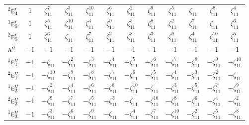 \documentclass[10pt,a4paper]{article}
\numberwithin{equation}{section}
\newcommand{\irr}[1]{\text{\normalfont\scshape #1}}
\newcommand{\conjpair}[1]{{}^{#1}}
\newcommand{\rootunity}[1]{\zeta_{#1}}
\begin{document}
{\begin{longtable}{@{}lccccccccccc@{}}
$\conjpair{2}\irr{e}_{4}'$ & $1$ & $\rootunity{11}^{7}$ & $\rootunity{11}^{3}$ & $\rootunity{11}^{10}$ & $\rootunity{11}^{6}$ & $\rootunity{11}^{2}$ & $\rootunity{11}^{9}$ & $\rootunity{11}^{5}$ & $\rootunity{11}$ & $\rootunity{11}^{8}$ & $\rootunity{11}^{4}$\\
$\conjpair{1}\irr{e}_{5}'$ & $1$ & $\rootunity{11}^{5}$ & $\rootunity{11}^{10}$ & $\rootunity{11}^{4}$ & $\rootunity{11}^{9}$ & $\rootunity{11}^{3}$ & $\rootunity{11}^{8}$ & $\rootunity{11}^{2}$ & $\rootunity{11}^{7}$ & $\rootunity{11}$ & $\rootunity{11}^{6}$\\
$\conjpair{2}\irr{e}_{5}'$ & $1$ & $\rootunity{11}^{6}$ & $\rootunity{11}$ & $\rootunity{11}^{7}$ & $\rootunity{11}^{2}$ & $\rootunity{11}^{8}$ & $\rootunity{11}^{3}$ & $\rootunity{11}^{9}$ & $\rootunity{11}^{4}$ & $\rootunity{11}^{10}$ & $\rootunity{11}^{5}$\\
$\irr{a}''$ & $-1$ & $-1$ & $-1$ & $-1$ & $-1$ & $-1$ & $-1$ & $-1$ & $-1$ & $-1$ & $-1$\\
$\conjpair{1}\irr{e}_{1}''$ & $-1$ & $-\rootunity{11}$ & $-\rootunity{11}^{2}$ & $-\rootunity{11}^{3}$ & $-\rootunity{11}^{4}$ & $-\rootunity{11}^{5}$ & $-\rootunity{11}^{6}$ & $-\rootunity{11}^{7}$ & $-\rootunity{11}^{8}$ & $-\rootunity{11}^{9}$ & $-\rootunity{11}^{10}$\\
$\conjpair{2}\irr{e}_{1}''$ & $-1$ & $-\rootunity{11}^{10}$ & $-\rootunity{11}^{9}$ & $-\rootunity{11}^{8}$ & $-\rootunity{11}^{7}$ & $-\rootunity{11}^{6}$ & $-\rootunity{11}^{5}$ & $-\rootunity{11}^{4}$ & $-\rootunity{11}^{3}$ & $-\rootunity{11}^{2}$ & $-\rootunity{11}$\\
$\conjpair{1}\irr{e}_{2}''$ & $-1$ & $-\rootunity{11}^{2}$ & $-\rootunity{11}^{4}$ & $-\rootunity{11}^{6}$ & $-\rootunity{11}^{8}$ & $-\rootunity{11}^{10}$ & $-\rootunity{11}$ & $-\rootunity{11}^{3}$ & $-\rootunity{11}^{5}$ & $-\rootunity{11}^{7}$ & $-\rootunity{11}^{9}$\\
$\conjpair{2}\irr{e}_{2}''$ & $-1$ & $-\rootunity{11}^{9}$ & $-\rootunity{11}^{7}$ & $-\rootunity{11}^{5}$ & $-\rootunity{11}^{3}$ & $-\rootunity{11}$ & $-\rootunity{11}^{10}$ & $-\rootunity{11}^{8}$ & $-\rootunity{11}^{6}$ & $-\rootunity{11}^{4}$ & $-\rootunity{11}^{2}$\\
$\conjpair{1}\irr{e}_{3}''$ & $-1$ & $-\rootunity{11}^{3}$ & $-\rootunity{11}^{6}$ & $-\rootunity{11}^{9}$ & $-\rootunity{11}$ & $-\rootunity{11}^{4}$ & $-\rootunity{11}^{7}$ & $-\rootunity{11}^{10}$ & $-\rootunity{11}^{2}$ & $-\rootunity{11}^{5}$ & $-\rootunity{11}^{8}$\\

\end{longtable}}
\end{document}
